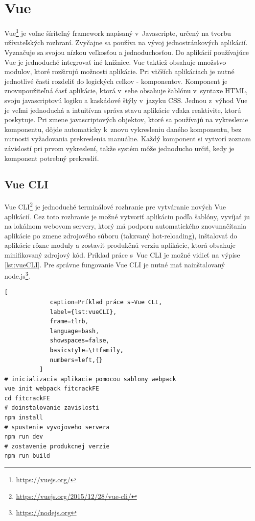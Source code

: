\documentclass[slovak]{fitthesis}
\begin{document}
\section{Vue}\label{vue}
Vue\footnote{\url{https://vuejs.org/}} je voľne šíriteľný framework napísaný v~Javascripte, určený na tvorbu užívateľských rozhraní. Zvyčajne sa používa na vývoj jednostránkových aplikácií. Vyznačuje sa svojou nízkou veľkosťou a jednoduchosťou. Do aplikácií používajúce Vue je jednoduché integrovať iné knižnice. Vue taktiež obsahuje množstvo modulov, ktoré rozširujú možnosti aplikácie. Pri väčších aplikáciach je nutné jednotlivé časti rozdeliť do logických celkov - komponentov. Komponent je znovupoužiteľná časť aplikácie, ktorá v~sebe obsahuje šablónu v~syntaxe HTML, svoju javascriptovú logiku a kaskádové štýly v~jazyku CSS. Jednou z~výhod Vue je veľmi jednoduchá a intuitívna správa stavu aplikácie vďaka reaktivite, ktorú poskytuje. Pri zmene javascriptových objektov, ktoré sa používajú na vykreslenie komponentu, dôjde automaticky k~znovu vykresleniu daného komponentu, bez nutnosti vyžadovania prekreslenia manuálne. Každý komponent si vytvorí zoznam závislostí pri prvom vykreslení, takže systém môže jednoducho určiť, kedy je komponent potrebný prekresliť.

\subsection{Vue CLI}\label{vueCli}
Vue CLI\footnote{\url{https://vuejs.org/2015/12/28/vue-cli/}} je jednoduché terminálové rozhranie pre vytváranie nových Vue aplikácií. Cez toto rozhranie je možné vytvoriť aplikáciu podľa šablóny, vyvíjať ju na lokálnom webovom servery, ktorý má podporu automatického znovunačítania aplikácie po zmene zdrojového súboru (takzvaný hot-reloading), inštalovať do aplikácie rôzne moduly a zostaviť produkčnú verziu aplikácie, ktorá obsahuje minifikovaný zdrojový kód. Príklad práce s~Vue CLI je možné vidieť na výpise \ref{lst:vueCLI}. Pre správne fungovanie Vue CLI je nutné mať nainštalovaný node.js\footnote{\url{https://nodejs.org}}.

\begin{lstlisting}[
             caption=Príklad práce s~Vue CLI,
             label={lst:vueCLI},
             frame=tlrb,
             language=bash,
             showspaces=false,
             basicstyle=\ttfamily,
             numbers=left,{}
          ]
# inicializacia aplikacie pomocou sablony webpack
vue init webpack fitcrackFE
cd fitcrackFE
# doinstalovanie zavislosti
npm install
# spustenie vyvojoveho servera
npm run dev
# zostavenie produkcnej verzie
npm run build
\end{lstlisting}
\end{document}
